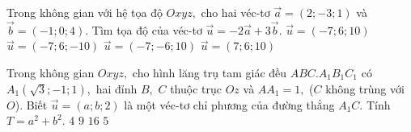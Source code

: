 \begin{ex}%
Trong không gian với hệ tọa độ $Oxyz,$ cho hai véc-tơ $\vec{a}=(2;-3;1)$ và $\vec{b}=(-1;0;4).$ Tìm tọa độ của véc-tơ $\vec{u}=-2\vec{a}+3\vec{b}.$
\choice
{\True $\vec{u}=(-7;6;10)$}
{$\vec{u}=(-7;6;-10)$}
{$\vec{u}=(-7;-6;10)$}
{$\vec{u}=(7;6;10)$}
\end{ex}

\begin{ex}%
Trong không gian $Oxyz,$ cho hình lăng trụ tam giác đều $ABC.A_1B_1C_1$ có $A_1\left(\sqrt{3};-1;1\right),$ hai đỉnh $B,$ $C$ thuộc trục $Oz$ và $AA_1=1,$ ($C$ không trùng với $O$). Biết $\vec{u}=(a;b;2)$ là một véc-tơ chỉ phương của đường thẳng $A_1C.$ Tính $T=a^2+b^2.$
\choice
{$4$}
{$9$}
{\True $16$}
{$5$}
\end{ex}
